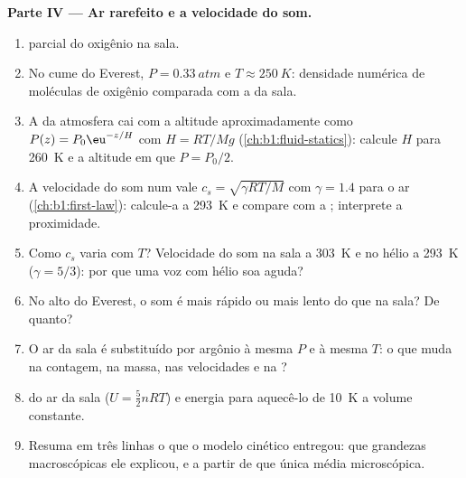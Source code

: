 \begin{problem}
\medskip
\noindent\textbf{Parte IV --- Ar rarefeito e a velocidade do som.}
\begin{enumerate}[resume]
  \item {} parcial do oxigênio na sala.
  \item No cume do Everest, $P = \qty{0.33}{atm}$ e $T \approx \qty{250}{K}$:
        densidade numérica de moléculas de oxigênio comparada com a da sala.
  \item A  da atmosfera cai com a altitude aproximadamente como
        $P(z) = P_0\eu^{-z/H}$ com $H = RT/Mg$ (\cref{ch:b1:fluid-statics}):
        calcule $H$ para \qty{260}{K} e a altitude em que $P = P_0/2$.
  \item A velocidade do som num  vale $c_s = \sqrt{\gamma RT/M}$
        com $\gamma = 1.4$ para o ar (\cref{ch:b1:first-law}): calcule-a a
        \qty{293}{K} e compare com a ; interprete
        a proximidade.
  \item Como $c_s$ varia com $T$? Velocidade do som na sala a
        \qty{303}{K} e no hélio a \qty{293}{K} ($\gamma = 5/3$): por que uma
        voz com hélio soa aguda?
  \item No alto do Everest, o som é mais rápido ou mais lento do que na
        sala? De quanto?
  \item O ar da sala é substituído por argônio à mesma $P$ e à mesma $T$:
        o que muda na contagem, na massa, nas velocidades e na ?
  \item {} do ar da sala ($U = \tfrac52 nRT$) e energia para
        aquecê-lo de \qty{10}{K} a volume constante.
  \item Resuma em três linhas o que o modelo cinético entregou: que
        grandezas macroscópicas ele explicou, e a partir de que única média
        microscópica.
\end{enumerate}
\end{problem}
